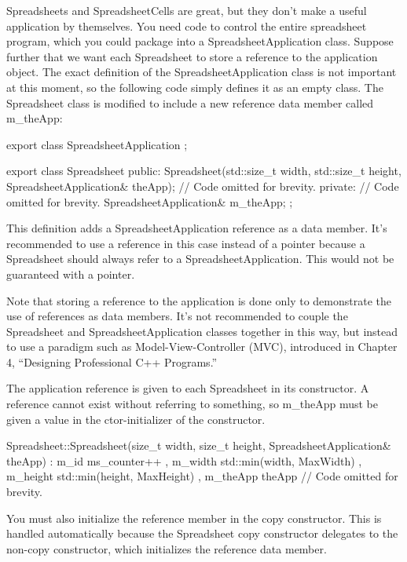Spreadsheets and SpreadsheetCells are great, but they don’t make a useful application by themselves. You need code to control the entire spreadsheet program, which you could package into a SpreadsheetApplication class. Suppose further that we want each Spreadsheet to store a reference to the application object. The exact definition of the SpreadsheetApplication class is not important at this moment, so the following code simply defines it as an empty class. The Spreadsheet class is modified to include a new reference data member called m\_theApp:

\begin{cpp}
export class SpreadsheetApplication { };

export class Spreadsheet
{
    public:
        Spreadsheet(std::size_t width, std::size_t height,
            SpreadsheetApplication& theApp);
        // Code omitted for brevity.
    private:
        // Code omitted for brevity.
        SpreadsheetApplication& m_theApp;
};
\end{cpp}

This definition adds a SpreadsheetApplication reference as a data member. It’s recommended to use a reference in this case instead of a pointer because a Spreadsheet should always refer to a SpreadsheetApplication. This would not be guaranteed with a pointer.

Note that storing a reference to the application is done only to demonstrate the use of references as data members. It’s not recommended to couple the Spreadsheet and SpreadsheetApplication classes together in this way, but instead to use a paradigm such as Model-View-Controller (MVC), introduced in Chapter 4, “Designing Professional C++ Programs.”

The application reference is given to each Spreadsheet in its constructor. A reference cannot exist without referring to something, so m\_theApp must be given a value in the ctor-initializer of the constructor.

\begin{cpp}
Spreadsheet::Spreadsheet(size_t width, size_t height,
    SpreadsheetApplication& theApp)
    : m_id { ms_counter++ }
    , m_width { std::min(width, MaxWidth) }
    , m_height { std::min(height, MaxHeight) }
    , m_theApp { theApp }
{
    // Code omitted for brevity.
}
\end{cpp}

You must also initialize the reference member in the copy constructor. This is handled automatically because the Spreadsheet copy constructor delegates to the non-copy constructor, which initializes the reference data member.


